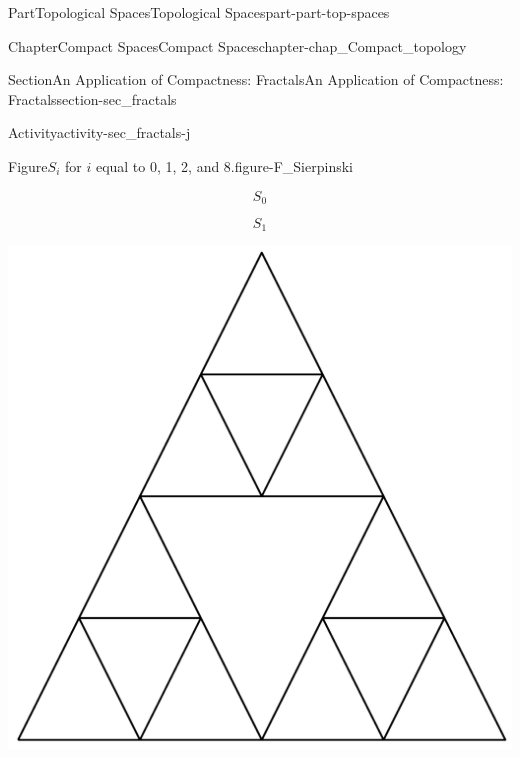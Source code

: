 \documentclass[oneside,10pt,]{book}
\numberwithin{equation}{chapter}
\begin{document}
\begin{partptx}{Part}{Topological Spaces}{}{Topological Spaces}{}{}{part-part-top-spaces}
\begin{chapterptx}{Chapter}{Compact Spaces}{}{Compact Spaces}{}{}{chapter-chap_Compact_topology}
\begin{sectionptx}{Section}{An Application of Compactness: Fractals}{}{An Application of Compactness: Fractals}{}{}{section-sec_fractals}
\begin{activity}{Activity}{}{activity-sec_fractals-j}
\begin{enumerate}[font=\bfseries,label=(\alph*),ref=\alph*]
\begin{figureptx}{Figure}{\(S_i\) for \(i\) equal to 0, 1, 2, and 8.}{figure-F_Sierpinski}{}
\begin{sidebyside}{2}{0}{0}{0}
\begin{sbspanel}{0.5}
\end{sbspanel}%
\end{sidebyside}%
\begin{sidebyside}{2}{0}{0}{0}%
\begin{sbspanel}{0.5}%
%
\begin{equation*}
S_0
\end{equation*}
%
\end{sbspanel}%
\begin{sbspanel}{0.5}%
\par
%
\begin{equation*}
S_1
\end{equation*}
%
\end{sbspanel}%
\end{sidebyside}%
\begin{sidebyside}{2}{0}{0}{0}%
\begin{sbspanel}{0.5}%
\includegraphics[width=\linewidth]{external/S2.pdf}
\end{sbspanel}%
\begin{sbspanel}{0.5}%

\end{sbspanel}
\end{sidebyside}
\end{figureptx}
\end{enumerate}
\end{activity}
\end{sectionptx}
\end{chapterptx}
\end{partptx}
\end{document}
